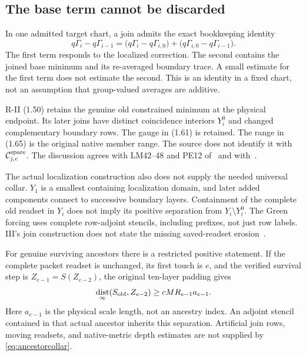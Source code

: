 \documentclass[11pt,letterpaper]{article}
\numberwithin{equation}{section}
\theoremstyle{plain}
\theoremstyle{remark}\newtheorem{remark}[theorem]{Scope}
\DeclareMathOperator{\dist}{dist}\DeclareMathOperator{\diag}{diag}
\begin{document}
\subsection{The base term cannot be discarded}

In one admitted target chart, a join admits the exact bookkeeping identity
\begin{equation}
 q\Gamma_i-q\Gamma_{i-1}
 =\bigl(q\Gamma_i-q\Gamma_{i,0}\bigr)
  +\bigl(q\Gamma_{i,0}-q\Gamma_{i-1}\bigr).
 \label{eq:base}
\end{equation}
The first term responds to the localized correction. The second contains
the joined base minimum and its re-averaged boundary trace. A small estimate
for the first term does not estimate the second. This is an identity in a
fixed chart, not an assumption that group-valued averages are additive.

R-II (1.50) retains the genuine old constrained minimum at the physical
endpoint. Its later joins have distinct coincidence interiors $Y_i^0$ and
changed complementary boundary rows. The gauge in (1.61) is retained.
The range in (1.65) is the original native member range. The
source does not identify it with $\mathcal C^{\rm spare}_{j,e}$.
The discussion agrees with LM42--48 and PE12 of~\cite[pp.~781--783, 1174--1180]{W} and with~\cite{rii}.

The actual localization construction also does not supply the needed
universal collar. $Y_1$ is a smallest containing localization domain, and
later added components connect to successive boundary layers. Containment
of the complete old readset in $Y_i$ does not imply its positive separation
from $Y_i\setminus Y_i^0$. The Green forcing uses complete row-adjoint
stencils, including prefixes, not just row labels. III's join construction
does not state the missing saved-readset erosion~\cite{iii}.

For genuine surviving ancestors there is a restricted positive statement.
If the complete packet readset is unchanged, its first touch is $e$, and
the verified survival step is $Z_{e-1}=S(Z_{e-2})$, the original ten-layer
padding gives
\begin{equation}
 \dist_\infty(S_{\rm old},Z_{e-2})
 \ge cM R_{e-1}a_{e-1}.
 \label{eq:ancestorcollar}
\end{equation}
Here $a_{e-1}$ is the physical scale length, not an ancestry index.
An adjoint stencil contained in that actual ancestor inherits this
separation. Artificial join rows, moving readsets, and native-metric depth
estimates are not supplied by \eqref{eq:ancestorcollar}.
\end{document}
